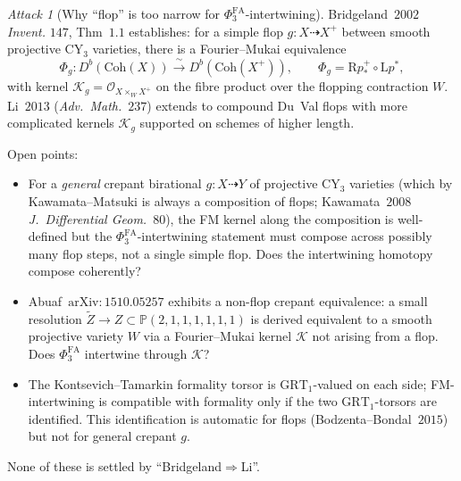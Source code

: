 \documentclass[11pt]{article}
\theoremstyle{definition}
\theoremstyle{remark}
\newtheorem{attack}[theorem]{Attack}
\providecommand{\PhiFA}{\Phi^{\mathrm{FA}}}
\providecommand{\Coh}{\mathrm{Coh}}
\providecommand{\cK}{\mathcal{K}}
\providecommand{\cO}{\mathcal{O}}
\providecommand{\PP}{\mathbb{P}}
\providecommand{\GRT}{\mathrm{GRT}}
\begin{document}
\begin{attack}[Why ``flop'' is too narrow for $\PhiFA_3$-intertwining]
\label{att:a-cycle-1}
Bridgeland~$2002$ \emph{Invent.} $147$, Thm~$1.1$ establishes: for a
simple flop $g \colon X \dashrightarrow X^+$ between smooth projective
CY$_3$ varieties, there is a Fourier--Mukai equivalence
\[
 \Phi_g \colon D^b(\Coh(X)) \xrightarrow{\ \sim\ } D^b(\Coh(X^+)),
 \qquad \Phi_g = \mathrm{R} p^+_* \circ \mathrm{L} p^*,
\]
with kernel $\cK_g = \cO_{X \times_W X^+}$ on the fibre product over
the flopping contraction $W$. Li~$2013$ (\emph{Adv.\ Math.}~$237$)
extends to compound Du~Val flops with more complicated kernels
$\cK_g$ supported on schemes of higher length.

Open points:
\begin{itemize}
 \item For a \emph{general} crepant birational $g \colon X \dashrightarrow Y$
  of projective CY$_3$ varieties (which by Kawamata--Matsuki is always a
  composition of flops; Kawamata~$2008$ \emph{J.\ Differential Geom.}~$80$),
  the FM kernel along the composition is well-defined but the
  $\PhiFA_3$-intertwining statement must compose across possibly many
  flop steps, not a single simple flop. Does the intertwining homotopy
  compose coherently?
 \item Abuaf~$\mathrm{arXiv}{:}1510.05257$ exhibits a non-flop crepant
  equivalence: a small resolution
  $\widetilde Z \to Z \subset \PP(2,1,1,1,1,1,1)$ is derived
  equivalent to a smooth projective variety $W$ via a Fourier--Mukai
  kernel $\cK$ not arising from a flop. Does $\PhiFA_3$ intertwine
  through $\cK$?
 \item The Kontsevich--Tamarkin formality torsor is $\GRT_1$-valued
  on each side; FM-intertwining is compatible with formality only if
  the two $\GRT_1$-torsors are identified. This identification is
  automatic for flops (Bodzenta--Bondal~$2015$) but not for general
  crepant $g$.
\end{itemize}
None of these is settled by ``Bridgeland$\Rightarrow$Li''.
\end{attack}
\end{document}
